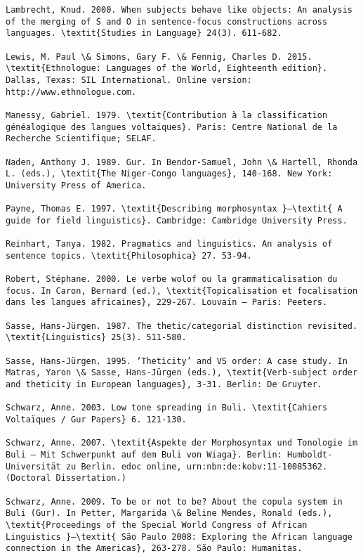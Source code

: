 \documentclass[output=paper]{langsci/langscibook}
\begin{document}
\begin{verbatim}
Lambrecht, Knud. 2000. When subjects behave like objects: An analysis of the merging of S and O in sentence-focus constructions across languages. \textit{Studies in Language} 24(3). 611-682.

Lewis, M. Paul \& Simons, Gary F. \& Fennig, Charles D. 2015. \textit{Ethnologue: Languages of the World, Eighteenth edition}. Dallas, Texas: SIL International. Online version: http://www.ethnologue.com.

Manessy, Gabriel. 1979. \textit{Contribution à la classification généalogique des langues voltaiques}. Paris: Centre National de la Recherche Scientifique; SELAF.

Naden, Anthony J. 1989. Gur. In Bendor-Samuel, John \& Hartell, Rhonda L. (eds.), \textit{The Niger-Congo languages}, 140-168. New York: University Press of America.

Payne, Thomas E. 1997. \textit{Describing morphosyntax }–\textit{ A guide for field linguistics}. Cambridge: Cambridge University Press.

Reinhart, Tanya. 1982. Pragmatics and linguistics. An analysis of sentence topics. \textit{Philosophica} 27. 53-94.

Robert, Stéphane. 2000. Le verbe wolof ou la grammaticalisation du focus. In Caron, Bernard (ed.), \textit{Topicalisation et focalisation dans les langues africaines}, 229-267. Louvain – Paris: Peeters.

Sasse, Hans-Jürgen. 1987. The thetic/categorial distinction revisited. \textit{Linguistics} 25(3). 511-580.

Sasse, Hans-Jürgen. 1995. ‘Theticity’ and VS order: A case study. In Matras, Yaron \& Sasse, Hans-Jürgen (eds.), \textit{Verb-subject order and theticity in European languages}, 3-31. Berlin: De Gruyter.

Schwarz, Anne. 2003. Low tone spreading in Buli. \textit{Cahiers Voltaïques / Gur Papers} 6. 121-130.

Schwarz, Anne. 2007. \textit{Aspekte der Morphosyntax und Tonologie im Buli – Mit Schwerpunkt auf dem Buli von Wiaga}. Berlin: Humboldt-Universität zu Berlin. edoc online, urn:nbn:de:kobv:11-10085362. (Doctoral Dissertation.)

Schwarz, Anne. 2009. To be or not to be? About the copula system in Buli (Gur). In Petter, Margarida \& Beline Mendes, Ronald (eds.), \textit{Proceedings of the Special World Congress of African Linguistics }–\textit{ São Paulo 2008: Exploring the African language connection in the Americas}, 263-278. São Paulo: Humanitas.


\end{verbatim}
\end{document}

